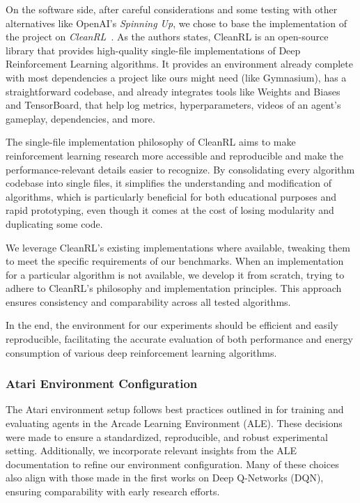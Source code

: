 On the software side, after careful considerations and some testing with other alternatives like OpenAI's \textit{Spinning Up}, we chose to base the implementation of the project on \textit{CleanRL}~\cite{huang:cleanrl}. As the authors states, CleanRL is an open-source library that provides high-quality single-file implementations of Deep Reinforcement Learning algorithms. It provides an environment already complete with most dependencies a project like ours might need (like Gymnasium), has a straightforward codebase, and already integrates tools like Weights and Biases and TensorBoard, that help log metrics, hyperparameters, videos of an agent's gameplay, dependencies, and more.

The single-file implementation philosophy of CleanRL aims to make reinforcement learning research more accessible and reproducible and make the performance-relevant details easier to recognize. By consolidating every algorithm codebase into single files, it simplifies the understanding and modification of algorithms, which is particularly beneficial for both educational purposes and rapid prototyping, even though it comes at the cost of losing modularity and duplicating some code.

We leverage CleanRL's existing implementations where available, tweaking them to meet the specific requirements of our benchmarks. When an implementation for a particular algorithm is not available, we develop it from scratch, trying to adhere to CleanRL's philosophy and implementation principles. This approach ensures consistency and comparability across all tested algorithms.

In the end, the environment for our experiments should be efficient and easily reproducible, facilitating the accurate evaluation of both performance and energy consumption of various deep reinforcement learning algorithms.


\subsubsection{Atari Environment Configuration}

The Atari environment setup follows best practices outlined in \cite{machado:revisiting_ale} for training and evaluating agents in the Arcade Learning Environment (ALE). These decisions were made to ensure a standardized, reproducible, and robust experimental setting. Additionally, we incorporate relevant insights from the ALE documentation to refine our environment configuration. Many of these choices also align with those made in the first works on Deep Q-Networks (DQN), ensuring comparability with early research efforts.

